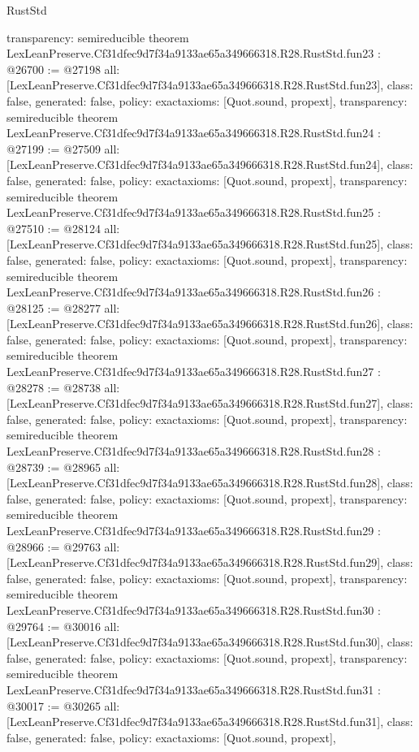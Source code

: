 \begin{lexlean}{RustStd}
\begin{coremodule}
{  transparency: semireducible
}
theorem LexLeanPreserve.Cf31dfec9d7f34a9133ae65a349666318.R28.RustStd.fun23 : @26700 := @27198 {
  all: [LexLeanPreserve.Cf31dfec9d7f34a9133ae65a349666318.R28.RustStd.fun23],
  class: false,
  generated: false,
  policy: exact{axioms: [Quot.sound, propext]},
  transparency: semireducible
}
theorem LexLeanPreserve.Cf31dfec9d7f34a9133ae65a349666318.R28.RustStd.fun24 : @27199 := @27509 {
  all: [LexLeanPreserve.Cf31dfec9d7f34a9133ae65a349666318.R28.RustStd.fun24],
  class: false,
  generated: false,
  policy: exact{axioms: [Quot.sound, propext]},
  transparency: semireducible
}
theorem LexLeanPreserve.Cf31dfec9d7f34a9133ae65a349666318.R28.RustStd.fun25 : @27510 := @28124 {
  all: [LexLeanPreserve.Cf31dfec9d7f34a9133ae65a349666318.R28.RustStd.fun25],
  class: false,
  generated: false,
  policy: exact{axioms: [Quot.sound, propext]},
  transparency: semireducible
}
theorem LexLeanPreserve.Cf31dfec9d7f34a9133ae65a349666318.R28.RustStd.fun26 : @28125 := @28277 {
  all: [LexLeanPreserve.Cf31dfec9d7f34a9133ae65a349666318.R28.RustStd.fun26],
  class: false,
  generated: false,
  policy: exact{axioms: [Quot.sound, propext]},
  transparency: semireducible
}
theorem LexLeanPreserve.Cf31dfec9d7f34a9133ae65a349666318.R28.RustStd.fun27 : @28278 := @28738 {
  all: [LexLeanPreserve.Cf31dfec9d7f34a9133ae65a349666318.R28.RustStd.fun27],
  class: false,
  generated: false,
  policy: exact{axioms: [Quot.sound, propext]},
  transparency: semireducible
}
theorem LexLeanPreserve.Cf31dfec9d7f34a9133ae65a349666318.R28.RustStd.fun28 : @28739 := @28965 {
  all: [LexLeanPreserve.Cf31dfec9d7f34a9133ae65a349666318.R28.RustStd.fun28],
  class: false,
  generated: false,
  policy: exact{axioms: [Quot.sound, propext]},
  transparency: semireducible
}
theorem LexLeanPreserve.Cf31dfec9d7f34a9133ae65a349666318.R28.RustStd.fun29 : @28966 := @29763 {
  all: [LexLeanPreserve.Cf31dfec9d7f34a9133ae65a349666318.R28.RustStd.fun29],
  class: false,
  generated: false,
  policy: exact{axioms: [Quot.sound, propext]},
  transparency: semireducible
}
theorem LexLeanPreserve.Cf31dfec9d7f34a9133ae65a349666318.R28.RustStd.fun30 : @29764 := @30016 {
  all: [LexLeanPreserve.Cf31dfec9d7f34a9133ae65a349666318.R28.RustStd.fun30],
  class: false,
  generated: false,
  policy: exact{axioms: [Quot.sound, propext]},
  transparency: semireducible
}
theorem LexLeanPreserve.Cf31dfec9d7f34a9133ae65a349666318.R28.RustStd.fun31 : @30017 := @30265 {
  all: [LexLeanPreserve.Cf31dfec9d7f34a9133ae65a349666318.R28.RustStd.fun31],
  class: false,
  generated: false,
  policy: exact{axioms: [Quot.sound, propext]},
}
\end{coremodule}
\end{lexlean}
